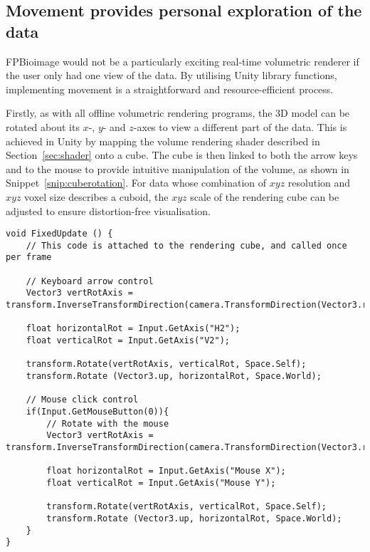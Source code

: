 



\subsection{Movement provides personal exploration of the data}
FPBioimage would not be a particularly exciting real-time volumetric renderer if the user only had one view of the data.
By utilising Unity library functions, implementing movement is a straightforward and resource-efficient process.

Firstly, as with all offline volumetric rendering programs, the 3D model can be rotated about its $x$-, $y$- and $z$-axes to view a different part of the data.
This is achieved in Unity by mapping the volume rendering shader described in Section~\ref{sec:shader} onto a cube.
The cube is then linked to both the arrow keys and to the mouse to provide intuitive manipulation of the volume, as shown in Snippet~\ref{snip:cuberotation}.
For data whose combination of $xyz$ resolution and $xyz$ voxel size describes a cuboid, the $xyz$ scale of the rendering cube can be adjusted to ensure distortion-free visualisation.

\begin{lstfloat}
\begin{lstlisting}[language={[Sharp]c}, label={snip:cuberotation}, caption={C\# code using built-in Unity functions for rotating the rendered volumetric data}]
void FixedUpdate () {
	// This code is attached to the rendering cube, and called once per frame

	// Keyboard arrow control
	Vector3 vertRotAxis = transform.InverseTransformDirection(camera.TransformDirection(Vector3.right)).normalized;

	float horizontalRot = Input.GetAxis("H2");
	float verticalRot = Input.GetAxis("V2");

	transform.Rotate(vertRotAxis, verticalRot, Space.Self);
	transform.Rotate (Vector3.up, horizontalRot, Space.World);

	// Mouse click control
	if(Input.GetMouseButton(0)){
		// Rotate with the mouse
		Vector3 vertRotAxis = transform.InverseTransformDirection(camera.TransformDirection(Vector3.right)).normalized;

		float horizontalRot = Input.GetAxis("Mouse X");
		float verticalRot = Input.GetAxis("Mouse Y");

		transform.Rotate(vertRotAxis, verticalRot, Space.Self);
		transform.Rotate (Vector3.up, horizontalRot, Space.World);
	}
}
\end{lstlisting}
\end{lstfloat}

